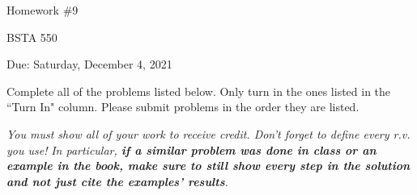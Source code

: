 \documentclass[12pt]{article}
\begin{document}
\begin{center}

Homework \#9

BSTA 550

Due: Saturday, December 4, 2021 

%

%
\bigskip



\end{center}


\bigskip

Complete all of the problems listed below. \newline 
Only turn in the ones listed in the ``Turn In" column. \newline
Please submit problems in the order they are listed.

\bigskip

\textit{You must show all of your work to receive credit. Don't forget to define every r.v. you use!}  \newline 
\textit{In particular, \textbf{if a similar problem was done in class or an example in the book, make sure to still show every step in the solution and not just cite the examples' results}.}  \newline 



\end{document}
